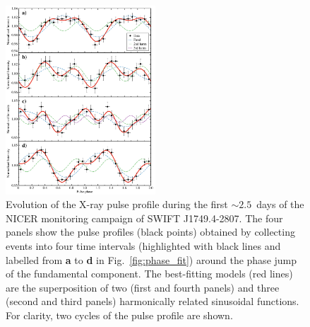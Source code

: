 \documentclass[fleqn,usenatbib]{mnras}
\newcommand{\swiftj}{SWIFT J1749.4-2807}
\newcommand{\nicer}{NICER}
\begin{document}
\begin{figure}
\centering
\includegraphics[width=0.5\textwidth]{best_profile}
\caption{Evolution of the X-ray pulse profile during the first $\sim 2.5$~days of the \nicer{} monitoring campaign of \swiftj{}. The four panels show the pulse profiles (black points) obtained by collecting events into four time intervals (highlighted with black lines and labelled from \textbf{a} to \textbf{d} in Fig.~\ref{fig:phase_fit}) around the phase jump of the fundamental component. The best-fitting models (red lines) are the superposition of two (first and fourth panels) and three (second and third panels) harmonically related sinusoidal functions. For clarity, two cycles of the pulse profile are shown.}
\label{fig:profile_evo}
\end{figure} 
\end{document}
